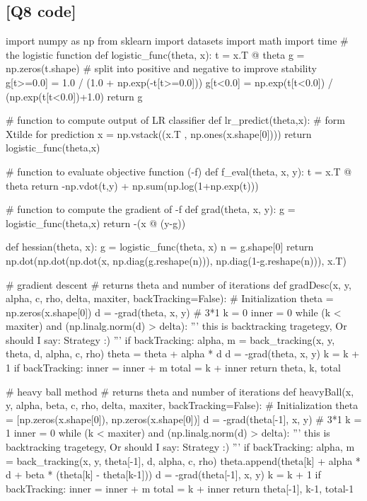 \documentclass[12pt, a4 paper]{article}
\begin{document}
    \subsection{[Q8 code]}
        \begin{python} 
import numpy as np
from sklearn import datasets
import math
import time
# the logistic function
def logistic_func(theta, x):
    t = x.T @ theta
    g = np.zeros(t.shape)
    # split into positive and negative to improve stability
    g[t>=0.0] = 1.0 / (1.0 + np.exp(-t[t>=0.0])) 
    g[t<0.0] = np.exp(t[t<0.0]) / (np.exp(t[t<0.0])+1.0)
    return g

# function to compute output of LR classifier
def lr_predict(theta,x):
    # form Xtilde for prediction
    x = np.vstack((x.T , np.ones(x.shape[0])))
    return logistic_func(theta,x)

# function to evaluate objective function (-f)
def f_eval(theta, x, y):
    t = x.T @ theta
    return -np.vdot(t,y) + np.sum(np.log(1+np.exp(t)))

# function to compute the gradient of -f
def grad(theta, x, y):
    g = logistic_func(theta,x)
    return -(x @ (y-g))

def hessian(theta, x):
    g = logistic_func(theta, x)
    n = g.shape[0]
    return np.dot(np.dot(np.dot(x, np.diag(g.reshape(n))), np.diag(1-g.reshape(n))), x.T)
    
    
# gradient descent
# returns theta and number of iterations
def gradDesc(x, y, alpha, c, rho, delta, maxiter, backTracking=False):
    # Initialization
    theta = np.zeros(x.shape[0])
    d = -grad(theta, x, y) # 3*1
    k = 0
    inner = 0
    while (k < maxiter) and (np.linalg.norm(d) > delta):
        '''
        this is backtracking tragetegy, Or should I say: Strategy :)
        '''
        if backTracking:
            alpha, m = back_tracking(x, y, theta, d, alpha, c, rho)
        theta = theta + alpha * d
        d = -grad(theta, x, y)
        k = k + 1
        if backTracking:
            inner = inner + m
    total = k + inner
    return theta, k, total


# heavy ball method
# returns theta and number of iterations
def heavyBall(x, y, alpha, beta, c, rho, delta, maxiter, backTracking=False):
    # Initialization
    theta = [np.zeros(x.shape[0]), np.zeros(x.shape[0])]
    d = -grad(theta[-1], x, y) # 3*1
    k = 1
    inner = 0
    while (k < maxiter) and (np.linalg.norm(d) > delta):
        '''
        this is backtracking tragetegy, Or should I say: Strategy :)
        '''
        if backTracking:
            alpha, m = back_tracking(x, y, theta[-1], d, alpha, c, rho)      
        theta.append(theta[k] + alpha * d + beta * (theta[k] - theta[k-1]))
        d = -grad(theta[-1], x, y)
        k = k + 1
        if backTracking:
            inner = inner + m
    total = k + inner
    return theta[-1], k-1, total-1




\end{python}
\end{document}
